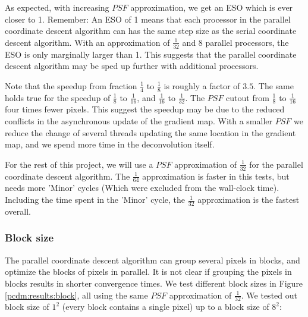 As expected, with increasing $PSF$ approximation, we get an ESO which is ever closer to 1. Remember: An ESO of 1 means that each processor in the parallel coordinate descent algorithm can has the same step size as the serial coordinate descent algorithm. With an approximation of $\frac{1}{32}$ and 8 parallel processors, the ESO is only marginally larger than 1. This suggests that the parallel coordinate descent algorithm may be sped up further with additional processors.

Note that the speedup from fraction $\frac{1}{4}$ to $\frac{1}{8}$ is roughly a factor of $3.5$. The same holds true for the speedup of $\frac{1}{8}$ to $\frac{1}{16}$, and $\frac{1}{16}$ to $\frac{1}{32}$. The $PSF$ cutout from  $\frac{1}{8}$ to  $\frac{1}{16}$ four times fewer pixels. This suggest the speedup may be due to the reduced conflicts in the asynchronous update of the gradient map. With a smaller $PSF$ we reduce the change of several threads updating the same location in the gradient map, and we spend more time in the deconvolution itself.

For the rest of this project, we will use a $PSF$ approximation of $\frac{1}{32}$ for the parallel coordinate descent algorithm. The $\frac{1}{64}$ approximation is faster in this tests, but needs more 'Minor' cycles (Which were excluded from the wall-clock time). Including the time spent in the 'Minor' cycle, the $\frac{1}{32}$ approximation is the fastest overall.


\subsubsection{Block size}
The parallel coordinate descent algorithm can group several pixels in blocks, and optimize the blocks of pixels in parallel. It is not clear if grouping the pixels in blocks results in shorter convergence times. We test different block sizes in Figure \ref{pcdm:results:block}, all using the same $PSF$ approximation of $\frac{1}{32}$. We tested out block size of $1^2$ (every block contains a single pixel) up to a block size of $8^2$:

